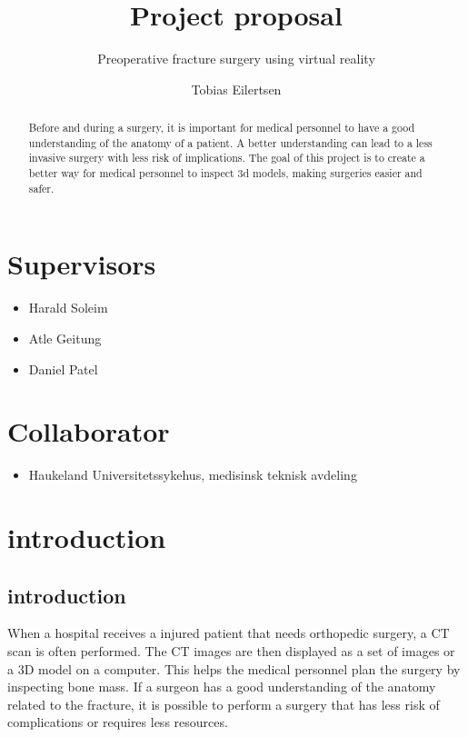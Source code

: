 \documentclass[11pt]{scrartcl}
\begin{document}
\title{Project proposal}
\subtitle{Preoperative fracture surgery using virtual reality}

\author{Tobias Eilertsen}
\maketitle


\section*{Supervisors}
\begin{itemize}
  \item Harald Soleim
  \item Atle Geitung
  \item Daniel Patel
\end{itemize}
\section*{Collaborator}
\begin{itemize}
  \item Haukeland Universitetssykehus, medisinsk teknisk avdeling
\end{itemize}

\begin{abstract}
Before and during a surgery, it is important for medical personnel to have a
good understanding of the anatomy of a patient. A better understanding can
lead to a less invasive surgery with less risk of implications.
The goal of this project is to create a better way for medical personnel to
inspect 3d models, making surgeries easier and safer.
\end{abstract}

\newpage
\section{introduction}


\subsection{introduction}

When a hospital receives a injured patient that needs orthopedic surgery, a CT scan is
often performed. The CT images are then displayed as a set of images or a 3D model on a computer. This helps
the medical personnel plan the surgery by inspecting bone mass.
If a surgeon has a good understanding of the anatomy related to the fracture,
it is possible to perform a surgery that has less risk of complications or requires less resources.
\end{document}
